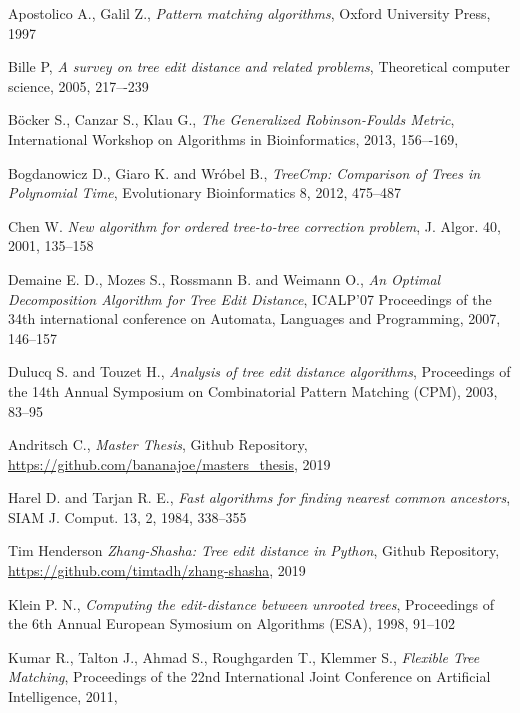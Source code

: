 \begin{thebibliography}{99}

  Apostolico A., Galil Z.,
  \textit{Pattern matching algorithms},
  Oxford University Press,
  1997
  
  Bille P,
  \textit{A survey on tree edit distance and related problems},
  Theoretical computer science,
  2005,
  217–-239
  
  Böcker S., Canzar S., Klau G.,
  \textit{The Generalized Robinson-Foulds Metric},
  International Workshop on Algorithms in Bioinformatics,
  2013,
  156–-169,
  
  Bogdanowicz D., Giaro K. and Wróbel B.,
  \textit{TreeCmp: Comparison of Trees in Polynomial Time},
  Evolutionary Bioinformatics 8,
  2012,
  475--487
   
  Chen W.
  \textit{New algorithm for ordered tree-to-tree correction problem},
  J. Algor. 40,
  2001,
  135--158
  
  Demaine E. D., Mozes S., Rossmann B. and Weimann O.,
  \textit{An Optimal Decomposition Algorithm for Tree Edit Distance},
  ICALP'07 Proceedings of the 34th international conference on Automata, Languages and Programming,
  2007,
  146--157

  Dulucq S. and Touzet H.,
  \textit{Analysis of tree edit distance algorithms},
  Proceedings of the 14th Annual Symposium on Combinatorial Pattern Matching (CPM),
  2003,
  83--95
  
  Andritsch C.,
  \textit{Master Thesis},
  Github Repository,
  \url{https://github.com/bananajoe/masters_thesis},
  2019
  
  Harel D. and Tarjan R. E.,
  \textit{Fast algorithms for finding nearest common ancestors},
  SIAM J. Comput. 13, 2,
  1984,
  338--355
  
  Tim Henderson
  \textit{Zhang-Shasha: Tree edit distance in Python},
  Github Repository,
  \url{https://github.com/timtadh/zhang-shasha},
  2019
  
  Klein P. N.,
  \textit{Computing the edit-distance between unrooted trees}, 
  Proceedings of the 6th Annual European Symosium on Algorithms (ESA),
  1998,
  91--102
  
  Kumar R., Talton J., Ahmad S., Roughgarden T., Klemmer S.,
  \textit{Flexible Tree Matching},
  Proceedings of the 22nd International Joint Conference on Artificial Intelligence,
  2011,
  

\end{thebibliography}
